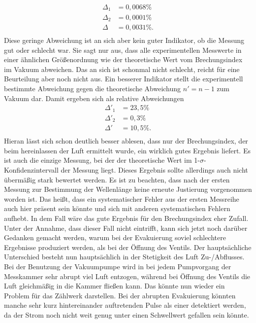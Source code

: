 \begin{align*}
    \Delta_1&=0,0068\%\\
    \Delta_2&=0,0001\%\\
    \Delta&=0,0031\%.\\
\end{align*}
Diese geringe Abweichung ist an sich aber kein guter Indikator, ob die Messung gut oder schlecht war. Sie sagt nur aus, dass 
alle experimentellen Messwerte in einer ähnlichen Größenordnung wie der theoretische Wert vom Brechungsindex im Vakuum abweichen.
Das an sich ist schonmal nicht schlecht, reicht für eine Beurteilung aber noch nicht aus. Ein besserer Indikator stellt die 
experimentell bestimmte Abweichung gegen die theoretische Abweichung $n'=n-1$ zum Vakuum dar.
Damit ergeben sich als relative Abweichungen
\begin{align*}
    \Delta'_1&=23,5\%\\
    \Delta'_2&=0,3\%\\
    \Delta'&=10,5\%.\\
\end{align*}
Hieran lässt sich schon deutlich besser ablesen, dass nur der Brechungsindex, der beim hereinlassen der Luft ermittelt wurde,
ein wirklich gutes Ergebnis liefert. Es ist auch die einzige Messung, bei der der theoretische 
Wert im 1-$\sigma$-Konfidenzintervall der Messung liegt.
Dieses Ergebnis sollte allerdings auch nicht übermäßig stark bewertet werden. Es ist zu beachten, dass 
nach der ersten Messung zur Bestimmung der Wellenlänge keine erneute Justierung vorgenommen worden ist. 
Das heißt, dass ein systematischer Fehler aus der ersten Messreihe auch hier präsent sein könnte und sich mit anderen systematischen Fehlern aufhebt. 
In dem Fall wäre das gute Ergebnis für den Brechungsindex eher Zufall.
Unter der Annahme, dass dieser Fall nicht eintrifft, kann sich jetzt noch darüber Gedanken gemacht werden, warum bei der Evakuierung soviel schlechtere 
Ergebnisse produziert werden, als bei der Öffnung des Ventils.
Der hauptsächliche Unterschied besteht nun hauptsächlich in der Stetigkeit des Luft Zu-/Abflusses.
Bei der Benutzung der Vakuumpumpe wird in bei jedem Pumpvorgang der Messkammer sehr abrupt viel 
Luft entzogen, während bei Öffnung des Ventils die Luft gleichmäßig in die Kammer fließen kann.
Das könnte nun wieder ein Problem für das Zählwerk darstellen.
Bei der abrupten Evakuierung könnten manche sehr kurz hintereinander auftretenden Pulse als einer detektiert werden,
da der Strom noch nicht weit genug unter einen Schwellwert gefallen sein könnte.
